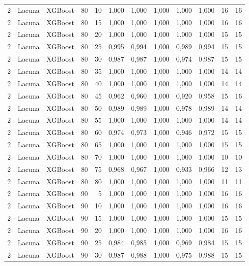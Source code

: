 \begin{longtable}{@{}rllrrrrrrrrr@{}}
2 & Lacuna & XGBoost & 80 & 10 & 1,000 & 1,000 & 1,000 & 1,000 & 1,000 & 16 & 16 \\
2 & Lacuna & XGBoost & 80 & 15 & 1,000 & 1,000 & 1,000 & 1,000 & 1,000 & 16 & 16 \\
2 & Lacuna & XGBoost & 80 & 20 & 1,000 & 1,000 & 1,000 & 1,000 & 1,000 & 15 & 15 \\
2 & Lacuna & XGBoost & 80 & 25 & 0,995 & 0,994 & 1,000 & 0,989 & 0,994 & 15 & 15 \\
2 & Lacuna & XGBoost & 80 & 30 & 0,987 & 0,987 & 1,000 & 0,974 & 0,987 & 15 & 15 \\
2 & Lacuna & XGBoost & 80 & 35 & 1,000 & 1,000 & 1,000 & 1,000 & 1,000 & 14 & 14 \\
2 & Lacuna & XGBoost & 80 & 40 & 1,000 & 1,000 & 1,000 & 1,000 & 1,000 & 14 & 14 \\
2 & Lacuna & XGBoost & 80 & 45 & 0,962 & 0,960 & 1,000 & 0,920 & 0,958 & 15 & 16 \\
2 & Lacuna & XGBoost & 80 & 50 & 0,989 & 0,989 & 1,000 & 0,978 & 0,989 & 14 & 14 \\
2 & Lacuna & XGBoost & 80 & 55 & 1,000 & 1,000 & 1,000 & 1,000 & 1,000 & 14 & 14 \\
2 & Lacuna & XGBoost & 80 & 60 & 0,974 & 0,973 & 1,000 & 0,946 & 0,972 & 15 & 15 \\
2 & Lacuna & XGBoost & 80 & 65 & 1,000 & 1,000 & 1,000 & 1,000 & 1,000 & 15 & 15 \\
2 & Lacuna & XGBoost & 80 & 70 & 1,000 & 1,000 & 1,000 & 1,000 & 1,000 & 10 & 10 \\
2 & Lacuna & XGBoost & 80 & 75 & 0,968 & 0,967 & 1,000 & 0,933 & 0,966 & 12 & 13 \\
2 & Lacuna & XGBoost & 80 & 80 & 1,000 & 1,000 & 1,000 & 1,000 & 1,000 & 11 & 11 \\
2 & Lacuna & XGBoost & 90 & 5 & 1,000 & 1,000 & 1,000 & 1,000 & 1,000 & 16 & 16 \\
2 & Lacuna & XGBoost & 90 & 10 & 1,000 & 1,000 & 1,000 & 1,000 & 1,000 & 16 & 16 \\
2 & Lacuna & XGBoost & 90 & 15 & 1,000 & 1,000 & 1,000 & 1,000 & 1,000 & 15 & 15 \\
2 & Lacuna & XGBoost & 90 & 20 & 1,000 & 1,000 & 1,000 & 1,000 & 1,000 & 16 & 16 \\
2 & Lacuna & XGBoost & 90 & 25 & 0,984 & 0,985 & 1,000 & 0,969 & 0,984 & 15 & 15 \\
2 & Lacuna & XGBoost & 90 & 30 & 0,987 & 0,988 & 1,000 & 0,975 & 0,988 & 15 & 15 \\

\end{longtable}
